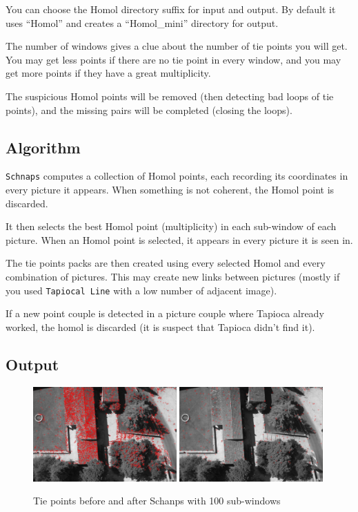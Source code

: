 You can choose the Homol directory suffix for input and output. By default it uses ``Homol'' and creates a ``Homol\_mini'' directory for output.

The number of windows gives a clue about the number of tie points you will get.
You may get less points if there are no tie point in every window, and you may get more points if they have a great multiplicity.

The suspicious Homol points will be removed (then detecting bad loops of tie points), and the missing pairs will be completed (closing the loops).


\subsection{Algorithm}
{\tt Schnaps} computes a collection of Homol points, each recording its coordinates in every picture it appears.
When something is not coherent, the Homol point is discarded.

It then selects the best Homol point (multiplicity) in each sub-window of each picture.
When an Homol point is selected, it appears in every picture it is seen in.

The tie points packs are then created using every selected Homol and every combination of pictures.
This may create new links between pictures (mostly if you used {\tt Tapiocal Line} with a low number of adjacent image).

If a new point couple is detected in a picture couple where Tapioca already worked, the homol is discarded (it is suspect that Tapioca didn't
find it).

\subsection{Output}

\begin{figure}
\begin{center}
\includegraphics[width=0.49\textwidth]{FIGS/Schnaps/Schnaps_homol_all.jpg}
\includegraphics[width=0.49\textwidth]{FIGS/Schnaps/Schnaps_homol_100.jpg}
\end{center}
\caption{Tie points before and after Schanps with 100 sub-windows}
\end{figure}

